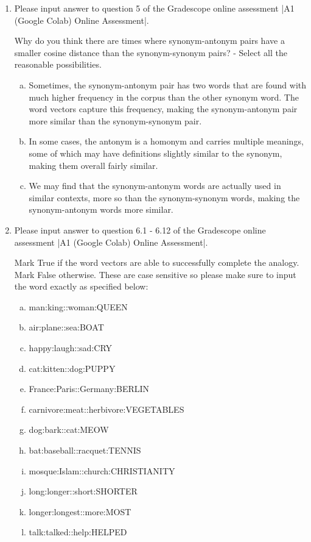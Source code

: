 \begin{enumerate}[1.]

\item {}

Please input answer to question 5 of the Gradescope online assessment |A1 (Google Colab) Online Assessment|.

Why do you think there are times where synonym-antonym pairs have a smaller cosine distance than the synonym-synonym pairs? - Select all the reasonable possibilities.

\begin{enumerate}[a.]
\item Sometimes, the synonym-antonym pair has two words that are found with much higher frequency in the corpus than the other synonym word. The word vectors capture this frequency, making the synonym-antonym pair more similar than the synonym-synonym pair.

\item In some cases, the antonym is a homonym and carries multiple meanings, some of which may have definitions slightly similar to the synonym, making them overall fairly similar.

\item We may find that the synonym-antonym words are actually used in similar contexts, more so than the synonym-synonym words, making the synonym-antonym words more similar.
\end{enumerate}


\item {}

Please input answer to question 6.1 - 6.12 of the Gradescope online assessment |A1 (Google Colab) Online Assessment|.

Mark True if the word vectors are able to successfully complete the analogy. Mark False otherwise. These are case sensitive so please make sure to input the word exactly as specified below:

\begin{enumerate}[a.]
\item \textsf{man:king::woman:QUEEN}
\item \textsf{air:plane::sea:BOAT}
\item \textsf{happy:laugh::sad:CRY} %
\item \textsf{cat:kitten::dog:PUPPY}
\item \textsf{France:Paris::Germany:BERLIN}
\item \textsf{carnivore:meat::herbivore:VEGETABLES} %
\item \textsf{dog:bark::cat:MEOW} %
\item \textsf{bat:baseball::racquet:TENNIS}
\item \textsf{mosque:Islam::church:CHRISTIANITY}
\item \textsf{long:longer::short:SHORTER}
\item \textsf{longer:longest::more:MOST}
\item \textsf{talk:talked::help:HELPED}
\end{enumerate}


\end{enumerate}
